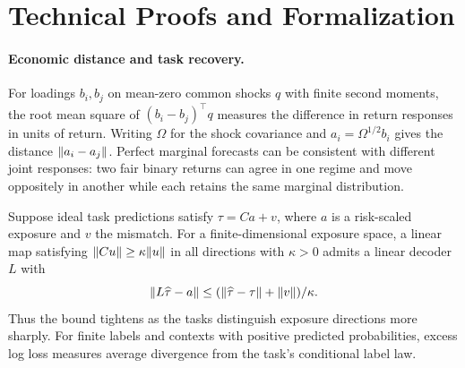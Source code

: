 \section{Technical Proofs and Formalization}
\label{app:proofs}

\paragraph{Economic distance and task recovery.}
For loadings $b_i,b_j$ on mean-zero common shocks $q$ with finite second
moments, the root mean square of $(b_i-b_j)^\top q$ measures the difference
in return responses in units of return. Writing $\Omega$ for the shock
covariance and $a_i=\Omega^{1/2}b_i$ gives the distance $\lVert a_i-a_j\rVert$.
Perfect marginal forecasts can be consistent with different joint responses:
two fair binary returns can agree in one regime and move oppositely in
another while each retains the same marginal distribution.

Suppose ideal task predictions satisfy $\tau=Ca+v$, where $a$ is a
risk-scaled exposure and $v$ the mismatch. For a finite-dimensional
exposure space, a linear map satisfying $\lVert Cu\rVert\geq\kappa\lVert u\rVert$
in all directions with $\kappa>0$ admits a linear decoder $L$ with
\[
  \lVert L\widehat\tau-a\rVert\leq
  (\lVert \widehat\tau-\tau\rVert+\lVert v\rVert)/\kappa .
\]
Thus the bound tightens as the tasks distinguish exposure directions more
sharply. For finite labels and contexts with positive predicted
probabilities, excess log loss measures average divergence from the task's
conditional label law.

